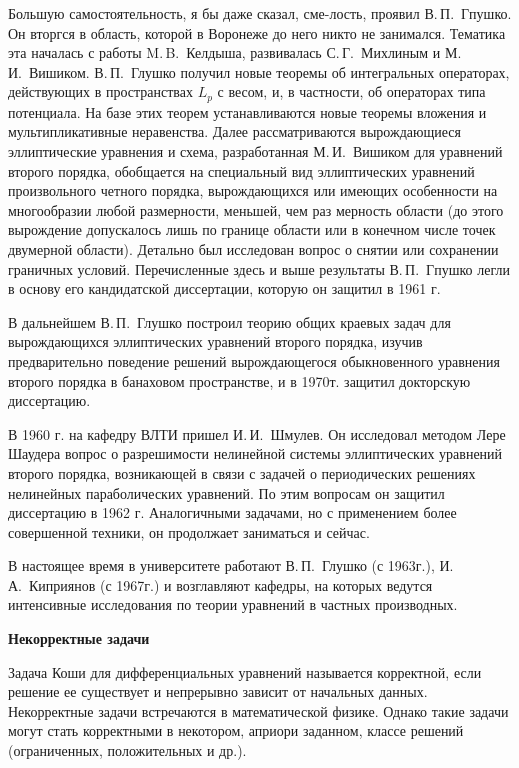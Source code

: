 Большую самостоятельность, я бы даже сказал,
сме-\linebreak лость,
проявил В.\,П.~Гпушко.
Он вторгся в область, которой в Воронеже до него никто не занимался. Тематика эта началась с работы M.\,B.~Келдыша, развивалась С.\,Г.~Михлиным и М.\,И.~Вишиком. В.\,П.~Глушко получил новые теоремы об интегральных операторах, действующих в пространствах  $L_p$ с весом, и, в частности, об операторах типа потенциала. На базе этих теорем устанавливаются новые теоремы вложения и мультипликативные неравенства. Далее рассматриваются вырождающиеся эллиптические уравнения и схема, разработанная М.\,И.~Вишиком для уравнений второго порядка, обобщается на специальный вид эллиптических уравнений произвольного четного порядка, вырождающихся или имеющих особенности на многообразии любой размерности, меньшей, чем раз мерность области (до этого вырождение допускалось лишь по границе области или в конечном числе точек двумерной области). Детально был исследован вопрос о снятии или сохранении граничных условий. Перечисленные здесь и выше результаты В.\,П.~Гпушко легли в основу его кандидатской диссертации, которую он защитил в 1961 г.

В дальнейшем В.\,П.~Глушко построил теорию общих краевых задач для вырождающихся эллиптических уравнений второго порядка, изучив предварительно поведение решений вырождающегося обыкновенного уравнения второго порядка в банаховом пространстве, и в 1970т. защитил докторскую диссертацию.

В 1960 г. на кафедру ВЛТИ пришел И.\,И.~Шмулев. Он исследовал методом Лере Шаудера вопрос о разрешимости нелинейной системы эллиптических уравнений второго порядка, возникающей в связи с задачей о периодических решениях нелинейных параболических уравнений. По этим вопросам он защитил диссертацию в 1962 г. Аналогичными задачами, но с применением более совершенной техники, он продолжает заниматься и сейчас.

В настоящее время в университете работают В.\,П.~Глушко (с 1963г.), И.\,А.~Киприянов (с 1967г.) и возглавляют кафедры, на которых ведутся интенсивные исследования по теории уравнений в частных производных.

{\bf Некорректные задачи}

Задача Коши для дифференциальных уравнений называется корректной, если решение ее существует и непрерывно зависит от начальных данных. Некорректные задачи встречаются в математической физике. Однако такие задачи могут стать корректными в некотором, априори заданном, классе решений (ограниченных, положительных и др.).

